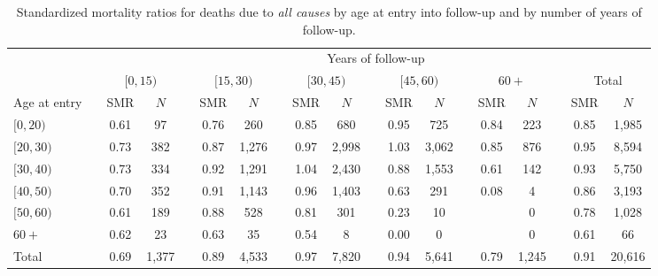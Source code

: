 \documentclass[]{article}
\begin{document}
\clearpage

\vspace*{1cm}

\begin{table}[H]
\centering
\caption{Standardized mortality ratios for deaths due to \emph{all causes} by age at entry into follow-up and by number of years of follow-up.} 
\begin{tabular}{llcclcclcclcclcclcc}
  \hline & &\multicolumn{17}{c}{Years of follow-up} \\ 
& &\multicolumn{2}{c}{$[0, 15)$} && \multicolumn{2}{c}{$[15, 30)$} && \multicolumn{2}{c}{$[30, 45)$} && \multicolumn{2}{c}{$[45, 60)$} && \multicolumn{2}{c}{$60+$} && \multicolumn{2}{c}{Total} \\ 
 \cline{3-4}\cline{6-7}\cline{9-10}\cline{12-13}\cline{15-16}\cline{18-19} 
Age at entry &   & SMR & $N$ &   & SMR & $N$ &   & SMR & $N$ &   & SMR & $N$ &   & SMR & $N$ &   & SMR & $N$ \\ 
  \midrule
$[0, 20)$ &  & 0.61 & 97 &  & 0.76 & 260 &  & 0.85 & 680 &  & 0.95 & 725 &  & 0.84 & 223 &  & 0.85 & 1,985 \\ 
  $[20, 30)$ &  & 0.73 & 382 &  & 0.87 & 1,276 &  & 0.97 & 2,998 &  & 1.03 & 3,062 &  & 0.85 & 876 &  & 0.95 & 8,594 \\ 
  $[30, 40)$ &  & 0.73 & 334 &  & 0.92 & 1,291 &  & 1.04 & 2,430 &  & 0.88 & 1,553 &  & 0.61 & 142 &  & 0.93 & 5,750 \\ 
  $[40, 50)$ &  & 0.70 & 352 &  & 0.91 & 1,143 &  & 0.96 & 1,403 &  & 0.63 & 291 &  & 0.08 & 4 &  & 0.86 & 3,193 \\ 
  $[50, 60)$ &  & 0.61 & 189 &  & 0.88 & 528 &  & 0.81 & 301 &  & 0.23 & 10 &  &  & 0 &  & 0.78 & 1,028 \\ 
  $60+$ &  & 0.62 & 23 &  & 0.63 & 35 &  & 0.54 & 8 &  & 0.00 & 0 &  &  & 0 &  & 0.61 & 66 \\ 
  Total &  & 0.69 & 1,377 &  & 0.89 & 4,533 &  & 0.97 & 7,820 &  & 0.94 & 5,641 &  & 0.79 & 1,245 &  & 0.91 & 20,616 \\ 
   \bottomrule
\end{tabular}
\end{table}

\vspace{1cm}
\end{document}
